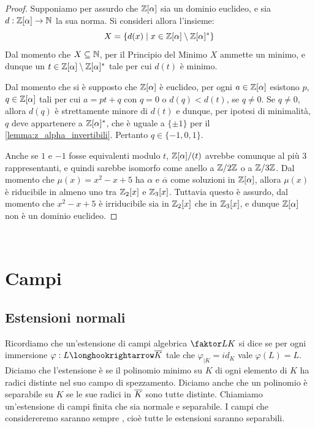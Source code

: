 \documentclass[11pt]{scrartcl}
\begin{document}
	\begin{proof}
		Supponiamo per assurdo che $\mathbb Z[\alpha]$ sia un dominio euclideo, e
		sia $d : \mathbb Z[\alpha] \to \mathbb N$ la sua norma. Si consideri allora
		l'insieme:
		\[ X = \{ d(x) \mid x \in \mathbb Z[\alpha] \setminus \mathbb Z[\alpha]^* \} \]
		Dal momento che $X \subseteq \mathbb N$, per il Principio del Minimo $X$
		ammette un minimo, e dunque un $t \in \mathbb Z[\alpha] \setminus \mathbb Z[\alpha]^*$
		tale per cui $d(t)$ è minimo. \medskip
		
		
		Dal momento che si è supposto che $\mathbb Z[\alpha]$ è euclideo, per
		ogni $a \in \mathbb Z[\alpha]$ esistono
		$p$, $q \in \mathbb Z[\alpha]$ tali per cui $a = p t + q$ con
		$q = 0$ o $d(q) < d(t)$, se $q \neq 0$. Se $q \neq 0$, allora
		$d(q)$ è strettamente minore di $d(t)$ e dunque, per ipotesi di minimalità,
		$q$ deve appartenere a $\mathbb Z[\alpha]^*$, che è uguale a $\{\pm 1\}$ per
		il \autoref{lemma:z_alpha_invertibili}. Pertanto
		$q \in \{-1, 0, 1\}$. \medskip
		
		
		Anche se $1$ e $-1$ fosse equivalenti modulo $t$, $\mathbb Z[\alpha]/(t)$ avrebbe
		comunque al più $3$ rappresentanti, e quindi sarebbe isomorfo come anello
		a $\mathbb Z/2\mathbb Z$ o a $\mathbb Z/3\mathbb Z$. Dal momento che $\mu(x) = x^2 - x + 5$ ha $\alpha$
		e $\overline{\alpha}$ come
		soluzioni in $\mathbb Z[\alpha]$, allora $\mu(x)$ è riducibile in almeno uno tra
		$\mathbb Z_2[x]$ e $\mathbb Z_3[x]$. Tuttavia questo è assurdo, dal momento
		che $x^2 - x + 5$ è irriducibile sia in $\mathbb Z_2[x]$ che in $\mathbb Z_3[x]$,
		e dunque $\mathbb Z[\alpha]$ non è un dominio euclideo.		
	\end{proof}

	\newpage
	\ %
	\newpage
	
	\section{Campi}
	
	\subsection{Estensioni normali}
	
	Ricordiamo che un'estensione di campi algebrica $\faktor L K$ si dice 
	 se per ogni immersione $\varphi: L\longhookrightarrow \ol{K}$
	tale che $\varphi_{\mid K} = id_K$ vale $\varphi(L) = L$. Diciamo che 
	l'estensione è  se il polinomio minimo su $K$ di ogni elemento
	di $K$ ha radici distinte nel suo campo di spezzamento. Diciamo anche che un 
	polinomio è separabile su $K$ se le sue radici in $\overline{K}$ sono tutte distinte. 
	Chiamiamo  un'estensione di campi finita che sia 
	normale e separabile. I campi che considereremo saranno sempre ,
	cioè tutte le estensioni saranno separabili.
	
\end{document}
